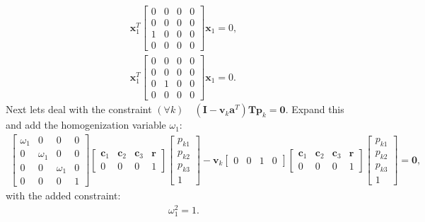 \documentclass{article}
\begin{document}
\begin{align}
    \mathbf{x}_1^T  \begin{bmatrix} 0 & 0 & 0 & 0 \\ 0 & 0 & 0 & 0 \\ 1 & 0 & 0 & 0 \\ 0 & 0 & 0 & 0 \end{bmatrix} \mathbf{x}_1 = 0,\\
    \mathbf{x}_1^T  \begin{bmatrix} 0 & 0 & 0 & 0 \\ 0 & 0 & 0 & 0 \\ 0 & 1 & 0 & 0 \\ 0 & 0 & 0 & 0 \end{bmatrix} \mathbf{x}_1 = 0.
\end{align}
Next lets deal with the constraint $(\forall k) \quad (\mathbf{I} - \mathbf{v}_k \mathbf{a}^T) \mathbf{T} \mathbf{p}_k = \mathbf{0}$. Expand this and add the homogenization variable $\omega_1$:
\begin{align}
    \begin{bmatrix} \omega_1 & 0 & 0 & 0 \\ 0 & \omega_1 & 0 & 0 \\ 0 & 0 & \omega_1 & 0 \\ 0 & 0 & 0 & 1\end{bmatrix}\begin{bmatrix} \mathbf{c}_1 & \mathbf{c}_2 & \mathbf{c}_3 & \mathbf{r} \\ 0 & 0 & 0 & 1\end{bmatrix} \begin{bmatrix} p_{k1} \\ p_{k2} \\ p_{k3} \\ 1 \end{bmatrix} - \mathbf{v}_k \begin{bmatrix} 0 & 0 & 1 & 0 \end{bmatrix} \begin{bmatrix} \mathbf{c}_1 & \mathbf{c}_2 & \mathbf{c}_3 & \mathbf{r} \\ 0 & 0 & 0 & 1\end{bmatrix} \begin{bmatrix} p_{k1} \\ p_{k2} \\ p_{k3} \\ 1 \end{bmatrix} = \mathbf{0},
\end{align}
with the added constraint:
\begin{align}
    \omega_1^2 = 1.
\end{align}
\end{document}
